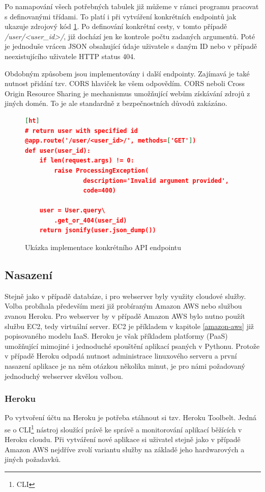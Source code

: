 \documentclass[thesis=B,czech]{FITthesis}[2012/06/26]
\begin{document}
Po namapování všech potřebných tabulek již můžeme v rámci programu pracovat s definovanými třídami. To platí i při vytváření konkrétních endpointů jak ukazuje zdrojový kód \ref{fig:user-view}. Po definování konkrétní cesty, v tomto případě \textit{/user/<user\_id>/}, již dochází jen ke kontrole počtu zadaných argumentů. Poté je jednoduše vrácen JSON obsahující údaje uživatele s daným ID nebo v případě neexistujícího uživatele HTTP status 404. 

Obdobným způsobem jsou implementovány i další endpointy. Zajímavá je také nutnost přidání tzv. CORS hlaviček ke všem odpovědím. CORS neboli Cross Origin Resource Sharing je mechanismus umožňující webům získávání zdrojů z jiných domén. To je ale standardně z bezpečnostních důvodů zakázáno. 

\begin{figure}
\begin{lstlisting}[language=json,firstnumber=1][ht]
# return user with specified id
@app.route('/user/<user_id>/', methods=['GET'])
def user(user_id):
	if len(request.args) != 0:
		raise ProcessingException(
				description='Invalid argument provided',
				code=400)

	user = User.query\
		.get_or_404(user_id)
	return jsonify(user.json_dump())
\end{lstlisting}
\caption{Ukázka implementace konkrétního API endpointu}
\label{fig:user-view}
\end{figure} 

\subsection{Nasazení}
Stejně jako v případě databáze, i pro webserver byly využity cloudové služby. Volba probíhala především mezi již probíraným Amazon AWS nebo službou zvanou Heroku. Pro webserver by v případě Amazon AWS bylo nutno použít službu EC2, tedy virtuální server. EC2 je příkladem v kapitole \ref{amazon-aws} již popisovaného modelu IaaS. Heroku je však příkladem platformy (PaaS) umožňující mimojiné i jednoduché spouštění aplikací psaných v Pythonu. Protože v případě Heroku odpadá nutnost administrace linuxového serveru a první nasazení aplikace je na něm otázkou několika minut, je pro námi požadovaný jednoduchý webserver skvělou volbou. 

\subsubsection{Heroku}
Po vytvoření účtu na Heroku je potřeba stáhnout si tzv. Heroku Toolbelt. Jedná se o CLI\footnote{CLI} nástroj sloužící právě ke správě a monitorování aplikací běžících v Heroku cloudu. Při vytváření nové aplikace si uživatel stejně jako v případě Amazon AWS nejdříve zvolí variantu služby na základě jeho hardwarových a jiných požadavků. 
\end{document}

